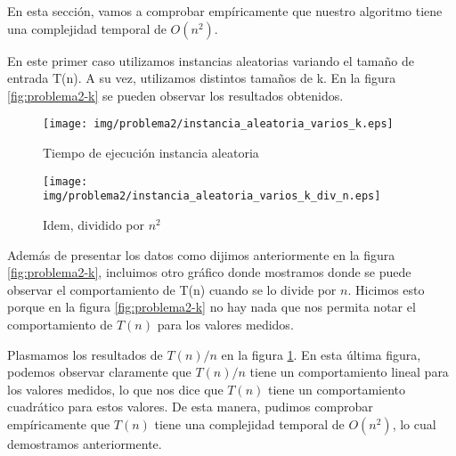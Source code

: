 En esta sección, vamos a comprobar empíricamente que nuestro algoritmo tiene una complejidad temporal de $O(n^2)$.

En este primer caso utilizamos instancias aleatorias variando el tamaño de entrada T(n). A su vez, utilizamos distintos tamaños de k. En la figura \ref{fig:problema2-k} se pueden observar los resultados obtenidos.

\begin{figure}[H]
  \begin{minipage}{0.5\linewidth}
    \texttt{[image: img/problema2/instancia\_aleatoria\_varios\_k.eps]}
\caption{Tiempo de ejecución instancia aleatoria}\label{fig:problema2-k}
\end{minipage}
  \hfill
  \begin{minipage}{0.5\linewidth}
    \texttt{[image: img/problema2/instancia\_aleatoria\_varios\_k\_div\_n.eps]}
    \caption{Idem, dividido por $n^2$}\label{fig:problema2-k-n}
  \end{minipage}	
\end{figure}

Además de presentar los datos como dijimos anteriormente en la figura \ref{fig:problema2-k}, incluimos otro gráfico donde mostramos donde se puede observar el comportamiento de T(n) cuando se lo divide por $n$. Hicimos esto porque en la figura \ref{fig:problema2-k} no hay nada que nos permita notar el comportamiento de $T(n)$ para los valores medidos.

Plasmamos los resultados de $T(n)/n$ en la figura \ref{fig:problema2-k-n}. En esta última figura, podemos observar claramente que $T(n) / n$ tiene un comportamiento lineal para los valores medidos, lo que nos dice que $T(n)$ tiene un comportamiento cuadrático para estos valores. De esta manera, pudimos comprobar empíricamente que $T(n)$ tiene una complejidad temporal de $O(n^2)$, lo cual demostramos anteriormente.